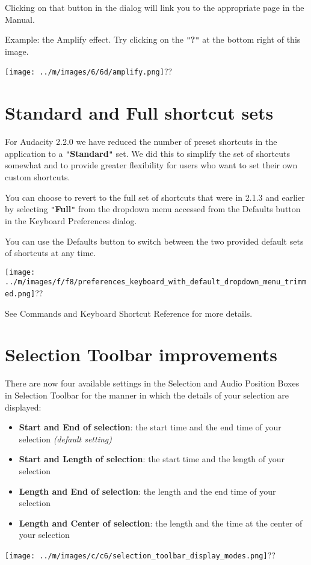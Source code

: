 \documentclass[twocolumn]{book}
\begin{document}
Clicking on that button in the dialog will link you to the appropriate page in the Manual.

Example: the Amplify effect.  Try clicking on the \texttt{{}"{}}\textbf{?}\texttt{{}"{}} at the bottom right of this image.\par\texttt{[image: ../m/images/6/6d/amplify.png]}??



\section{Standard and Full shortcut sets}


For Audacity 2.2.0 we have reduced the number of preset shortcuts in the application to a \texttt{{}"{}}\textbf{Standard}\texttt{{}"{}} set.  We did this to simplify the set of shortcuts somewhat and to provide greater flexibility for users who want to set their own custom shortcuts.

You can choose to revert to the full set of shortcuts that were in 2.1.3 and earlier by selecting \texttt{{}"{}}\textbf{Full}\texttt{{}"{}} from the dropdown menu accessed from the Defaults button in the Keyboard Preferences dialog.

You can use the Defaults button to switch between the two provided default sets of shortcuts at any time.\par\texttt{[image: ../m/images/f/f8/preferences\_keyboard\_with\_default\_dropdown\_menu\_trimmed.png]}??

See Commands and Keyboard Shortcut Reference for more details.



\section{Selection Toolbar improvements}


There are now four available settings in the Selection and Audio Position Boxes in Selection Toolbar for the  manner in which the details of your selection are displayed:
\begin{itemize}
\item \textbf{Start and End of selection}: the start time and the end time of your selection \textit{(default setting)}
\item \textbf{Start and Length of selection}: the start time and the length of your selection
\item \textbf{Length and End of selection}: the length and the end time of your selection
\item \textbf{Length and Center of selection}: the length and the time at the center of your selection
\end{itemize}
\par\texttt{[image: ../m/images/c/c6/selection\_toolbar\_display\_modes.png]}??
\end{document}

